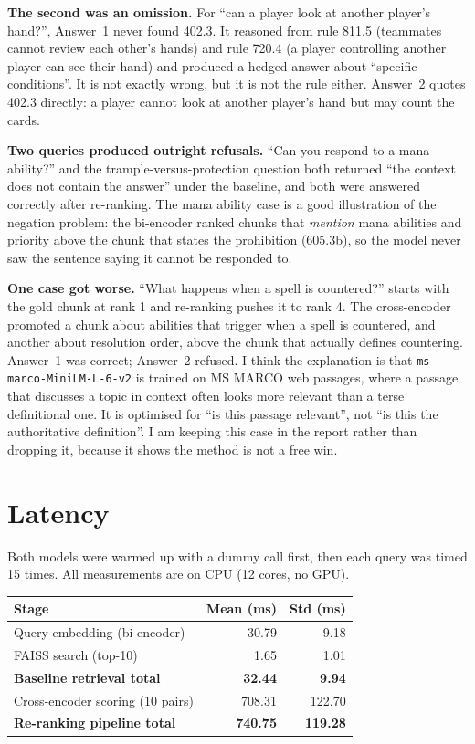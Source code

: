 \documentclass[11pt,a4paper]{article}
\newcommand{\code}[1]{\texttt{\small #1}}
\begin{document}
\textbf{The second was an omission.} For ``can a player look at another player's hand?'',
Answer~1 never found 402.3. It reasoned from rule 811.5 (teammates cannot review each other's
hands) and rule 720.4 (a player controlling another player can see their hand) and produced a
hedged answer about ``specific conditions''. It is not exactly wrong, but it is not the rule
either. Answer~2 quotes 402.3 directly: a player cannot look at another player's hand but may
count the cards.

\textbf{Two queries produced outright refusals.} ``Can you respond to a mana ability?'' and the
trample-versus-protection question both returned ``the context does not contain the answer''
under the baseline, and both were answered correctly after re-ranking. The mana ability case is
a good illustration of the negation problem: the bi-encoder ranked chunks that \emph{mention}
mana abilities and priority above the chunk that states the prohibition (605.3b), so the model
never saw the sentence saying it cannot be responded to.

\textbf{One case got worse.} ``What happens when a spell is countered?'' starts with the gold
chunk at rank 1 and re-ranking pushes it to rank 4. The cross-encoder promoted a chunk about
abilities that trigger when a spell is countered, and another about resolution order, above the
chunk that actually defines countering. Answer~1 was correct; Answer~2 refused. I think the
explanation is that \code{ms-marco-MiniLM-L-6-v2} is trained on MS MARCO web passages, where a
passage that discusses a topic in context often looks more relevant than a terse definitional
one. It is optimised for ``is this passage relevant'', not ``is this the authoritative
definition''. I am keeping this case in the report rather than dropping it, because it shows the
method is not a free win.

\section{Latency}

Both models were warmed up with a dummy call first, then each query was timed 15 times. All
measurements are on CPU (12 cores, no GPU).

\begin{center}
\small
\begin{tabular}{@{}lrr@{}}
\toprule
\textbf{Stage} & \textbf{Mean (ms)} & \textbf{Std (ms)} \\
\midrule
Query embedding (bi-encoder)          & 30.79  & 9.18 \\
FAISS search (top-10)                 & 1.65   & 1.01 \\
\textbf{Baseline retrieval total}     & \textbf{32.44} & \textbf{9.94} \\
Cross-encoder scoring (10 pairs)      & 708.31 & 122.70 \\
\textbf{Re-ranking pipeline total}    & \textbf{740.75} & \textbf{119.28} \\
\bottomrule
\end{tabular}
\end{center}
\end{document}
